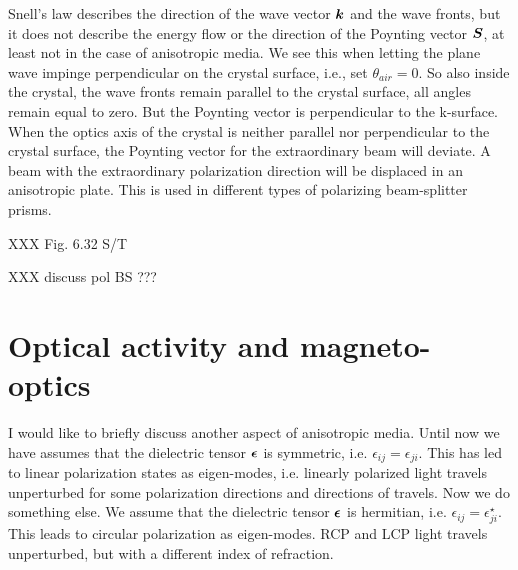 Snell's law describes the direction of the wave vector $\boldsymbol{k}$ and the wave fronts, but it does not describe the energy flow or the direction of the Poynting vector $\boldsymbol{S}$, at least not in the case of anisotropic media. We see this when letting the plane wave impinge perpendicular on the crystal surface, i.e., set $\theta_{air} = 0$. So also inside the crystal, the wave fronts remain parallel to the crystal surface, all angles remain equal to zero. But the Poynting vector is perpendicular to the k-surface. When the optics axis of the crystal is neither parallel nor perpendicular to the crystal surface, the Poynting vector for the extraordinary beam will deviate. A beam with the extraordinary polarization direction will be displaced in an anisotropic plate. This is used in different types of polarizing beam-splitter prisms.


XXX Fig. 6.32 S/T


XXX discuss pol BS ???

\section{Optical activity and magneto-optics}

I would like to briefly discuss another aspect of anisotropic media. Until now we have assumes that the dielectric tensor $\boldsymbol{\epsilon}$ is symmetric, i.e. $\epsilon_{ij} = \epsilon_{ji}$. This has led to linear polarization states as eigen-modes, i.e. linearly polarized light travels unperturbed for some polarization directions and directions of travels. Now we do something else. We assume that the dielectric tensor $\boldsymbol{\epsilon}$ is hermitian, i.e. $\epsilon_{ij} = \epsilon_{ji}^\star$. This leads to circular polarization as eigen-modes. RCP and LCP light travels unperturbed, but with a different index of refraction.

